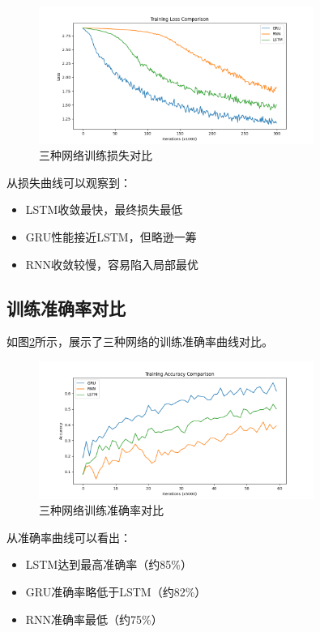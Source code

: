 \documentclass[a4paper]{article}
\begin{document}
\begin{figure}[H]
    \centering
    \includegraphics[width=0.8\textwidth]{loss_comparison.png}
    \caption{三种网络训练损失对比}
    \label{fig:loss_comparison}
\end{figure}

从损失曲线可以观察到：
\begin{itemize}
    \item LSTM收敛最快，最终损失最低
    \item GRU性能接近LSTM，但略逊一筹
    \item RNN收敛较慢，容易陷入局部最优
\end{itemize}

\subsection{训练准确率对比}
如图\ref{fig:accuracy_comparison}所示，展示了三种网络的训练准确率曲线对比。

\begin{figure}[H]
    \centering
    \includegraphics[width=0.8\textwidth]{accuracy_comparison.png}
    \caption{三种网络训练准确率对比}
    \label{fig:accuracy_comparison}
\end{figure}

从准确率曲线可以看出：
\begin{itemize}
    \item LSTM达到最高准确率（约85\%）
    \item GRU准确率略低于LSTM（约82\%）
    \item RNN准确率最低（约75\%）
\end{itemize}
\end{document}
